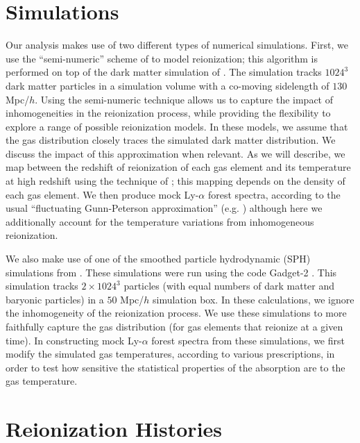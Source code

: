 \section{Simulations}
\label{sec:IGMTemperaturesims}

Our analysis makes use of two different types of numerical simulations. First, we use the ``semi-numeric'' scheme of
\citet{Zahn:2006sg} to model reionization; this algorithm is performed 
on top of the dark matter simulation of \citet{McQuinn:2007dy}. The \citet{McQuinn:2007dy} simulation
tracks $1024^3$ dark matter particles in a simulation volume with a co-moving sidelength of $130$ Mpc/$h$. 
Using the semi-numeric technique allows
us to capture the impact of inhomogeneities in the reionization process, while providing the flexibility to explore a range
of possible reionization models. In these models, we assume that the gas distribution closely traces the simulated dark
matter distribution. We discuss the impact of this approximation when relevant.
As we will describe,
we map between the redshift of reionization of each gas element and its temperature at high redshift using the technique
of \citet{Hui:1997dp}; this mapping depends on the density of each gas element. We then produce mock Ly-$\alpha$ forest
spectra, according to the usual ``fluctuating Gunn-Peterson approximation'' (e.g. \citealt{MiraldaEscude:1995bu,Croft:2000hs}) although here 
we additionally account for the temperature
variations from inhomogeneous reionization.

We also make use of one of the smoothed particle hydrodynamic (SPH) simulations from \citet{Lidz:2009ca}. These simulations 
were run using the code Gadget-2 \citep{2005MNRAS.364.1105S}. This simulation tracks $2\times 1024^3$ particles
(with equal numbers of dark matter and baryonic particles) in a $50$ Mpc/$h$ simulation box. In these calculations, we ignore
the inhomogeneity of the reionization process. We use these simulations to more faithfully capture the gas distribution (for
gas elements that reionize at a given time). In constructing mock Ly-$\alpha$ forest spectra from these simulations, we first
modify the simulated gas temperatures, according to various prescriptions, in order to test how sensitive the statistical properties of the
absorption are to the gas temperature.


\section{Reionization Histories}
\label{sec:IGMTemperaturereion_hist}


